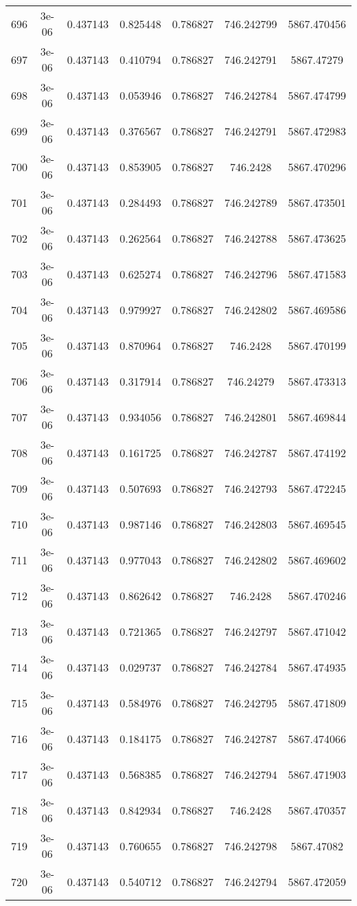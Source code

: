 \begin{table}
\begin{tabular*}{\linewidth}{c|c|c|c|c|c|c}
696 & 3e-06 & 0.437143 & 0.825448 & 0.786827 & 746.242799 & 5867.470456\\
697 & 3e-06 & 0.437143 & 0.410794 & 0.786827 & 746.242791 & 5867.47279\\
698 & 3e-06 & 0.437143 & 0.053946 & 0.786827 & 746.242784 & 5867.474799\\
699 & 3e-06 & 0.437143 & 0.376567 & 0.786827 & 746.242791 & 5867.472983\\
700 & 3e-06 & 0.437143 & 0.853905 & 0.786827 & 746.2428 & 5867.470296\\
701 & 3e-06 & 0.437143 & 0.284493 & 0.786827 & 746.242789 & 5867.473501\\
702 & 3e-06 & 0.437143 & 0.262564 & 0.786827 & 746.242788 & 5867.473625\\
703 & 3e-06 & 0.437143 & 0.625274 & 0.786827 & 746.242796 & 5867.471583\\
704 & 3e-06 & 0.437143 & 0.979927 & 0.786827 & 746.242802 & 5867.469586\\
705 & 3e-06 & 0.437143 & 0.870964 & 0.786827 & 746.2428 & 5867.470199\\
706 & 3e-06 & 0.437143 & 0.317914 & 0.786827 & 746.24279 & 5867.473313\\
707 & 3e-06 & 0.437143 & 0.934056 & 0.786827 & 746.242801 & 5867.469844\\
708 & 3e-06 & 0.437143 & 0.161725 & 0.786827 & 746.242787 & 5867.474192\\
709 & 3e-06 & 0.437143 & 0.507693 & 0.786827 & 746.242793 & 5867.472245\\
710 & 3e-06 & 0.437143 & 0.987146 & 0.786827 & 746.242803 & 5867.469545\\
711 & 3e-06 & 0.437143 & 0.977043 & 0.786827 & 746.242802 & 5867.469602\\
712 & 3e-06 & 0.437143 & 0.862642 & 0.786827 & 746.2428 & 5867.470246\\
713 & 3e-06 & 0.437143 & 0.721365 & 0.786827 & 746.242797 & 5867.471042\\
714 & 3e-06 & 0.437143 & 0.029737 & 0.786827 & 746.242784 & 5867.474935\\
715 & 3e-06 & 0.437143 & 0.584976 & 0.786827 & 746.242795 & 5867.471809\\
716 & 3e-06 & 0.437143 & 0.184175 & 0.786827 & 746.242787 & 5867.474066\\
717 & 3e-06 & 0.437143 & 0.568385 & 0.786827 & 746.242794 & 5867.471903\\
718 & 3e-06 & 0.437143 & 0.842934 & 0.786827 & 746.2428 & 5867.470357\\
719 & 3e-06 & 0.437143 & 0.760655 & 0.786827 & 746.242798 & 5867.47082\\
720 & 3e-06 & 0.437143 & 0.540712 & 0.786827 & 746.242794 & 5867.472059\\
\end{tabular*}
\end{table}
